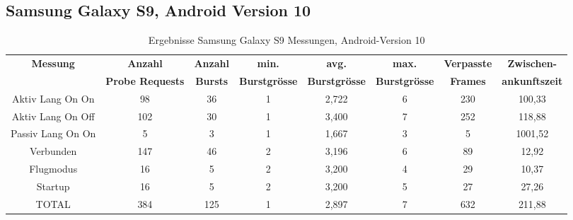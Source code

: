 \begin{landscape}
   \clearpage

   \subsection*{Samsung Galaxy S9, Android Version 10}
   \begin{table}[h!]
      \centering
      \begin{tabular}{|c|c|c|c|c|c|c|c|}
      \hline
      \textbf{Messung} & \textbf{Anzahl} & \textbf{Anzahl} & \textbf{min.} & \textbf{avg.} & \textbf{max.} & \textbf{Verpasste} & \textbf{Zwischen-}\\
      & \textbf{Probe Requests} & \textbf{Bursts} & \textbf{Burstgrösse} & \textbf{Burstgrösse} & \textbf{Burstgrösse} & \textbf{Frames} & \textbf{ankunftszeit}\\
      \hline
      Aktiv Lang On On & \phantom{0}98 & \phantom{0}36 & 1 & 2,722 & 6 & 230 & \phantom{0}100,33 \\
      Aktiv Lang On Off & 102 & \phantom{0}30 & 1 & 3,400 & 7 & 252 & \phantom{0}118,88 \\
      Passiv Lang On On & \phantom{00}5 & \phantom{00}3 & 1 & 1,667 & 3 & \phantom{00}5 & 1001,52 \\
      Verbunden   & 147 & \phantom{0}46 & 2 & 3,196 & 6 & \phantom{0}89 & \phantom{00}12,92 \\
      Flugmodus & \phantom{0}16 & \phantom{00}5 & 2 & 3,200 & 4 & \phantom{0}29 & \phantom{00}10,37 \\
      Startup & \phantom{0}16 & \phantom{00}5 & 2 & 3,200 & 5 & \phantom{0}27 & \phantom{00}27,26 \\
      \hline
      TOTAL & 384 & 125 & 1 & 2,897 & 7 & 632 & \phantom{0}211,88 \\
      \hline
      \end{tabular}
      \caption{Ergebnisse Samsung Galaxy S9 Messungen, Android-Version 10
      \label{table:samsunggalaxys9-10-results}} 
   \end{table}

   \clearpage


\end{landscape}
